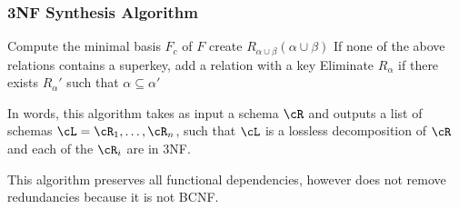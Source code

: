 \subsubsection{3NF Synthesis Algorithm}
\begin{algorithm}
    \caption{Synthesis algorithm}
    \begin{algorithmic}[1]
            \State Compute the minimal basis $F_c$ of $F$
                \State create $R_{\alpha \cup \beta}(\alpha \cup \beta)$
            \EndFor
            \State If none of the above relations contains a superkey, add a relation with a key
            \State Eliminate $R_\alpha$ if there exists $R_\alpha'$ such that $\alpha \subseteq \alpha'$
        \EndProcedure
    \end{algorithmic}
\end{algorithm}
In words, this algorithm takes as input a schema $\cR$ and outputs a list of schemas $\cL = \cR_1, \ldots, \cR_n$,
such that $\cL$ is a lossless decomposition of $\cR$ and each of the $\cR_i$ are in 3NF.

This algorithm preserves all functional dependencies, however does not remove redundancies because it is not BCNF.

